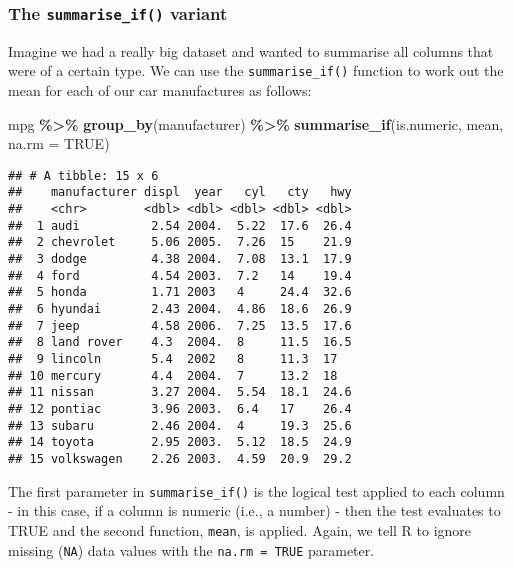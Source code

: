 \documentclass[
]{book}
\newenvironment{Shaded}{\begin{snugshade}}{\end{snugshade}}
\newcommand{\AttributeTok}[1]{\textcolor[rgb]{0.13,0.29,0.53}{#1}}
\newcommand{\ConstantTok}[1]{\textcolor[rgb]{0.56,0.35,0.01}{#1}}
\newcommand{\FunctionTok}[1]{\textcolor[rgb]{0.13,0.29,0.53}{\textbf{#1}}}
\newcommand{\NormalTok}[1]{#1}
\newcommand{\SpecialCharTok}[1]{\textcolor[rgb]{0.81,0.36,0.00}{\textbf{#1}}}
\begin{document}
\hypertarget{the-summarise_if-variant}{%
\subsubsection*{\texorpdfstring{The \texttt{summarise\_if()} variant}{The summarise\_if() variant}}\label{the-summarise_if-variant}}

Imagine we had a really big dataset and wanted to summarise all columns that were of a certain type. We can use the \texttt{summarise\_if()} function to work out the mean for each of our car manufactures as follows:

\begin{Shaded}
\begin{Highlighting}[]
\NormalTok{mpg }\SpecialCharTok{\%\textgreater{}\%} 
  \FunctionTok{group\_by}\NormalTok{(manufacturer) }\SpecialCharTok{\%\textgreater{}\%}
  \FunctionTok{summarise\_if}\NormalTok{(is.numeric, mean, }\AttributeTok{na.rm =} \ConstantTok{TRUE}\NormalTok{)}
\end{Highlighting}
\end{Shaded}

\begin{verbatim}
## # A tibble: 15 x 6
##    manufacturer displ  year   cyl   cty   hwy
##    <chr>        <dbl> <dbl> <dbl> <dbl> <dbl>
##  1 audi          2.54 2004.  5.22  17.6  26.4
##  2 chevrolet     5.06 2005.  7.26  15    21.9
##  3 dodge         4.38 2004.  7.08  13.1  17.9
##  4 ford          4.54 2003.  7.2   14    19.4
##  5 honda         1.71 2003   4     24.4  32.6
##  6 hyundai       2.43 2004.  4.86  18.6  26.9
##  7 jeep          4.58 2006.  7.25  13.5  17.6
##  8 land rover    4.3  2004.  8     11.5  16.5
##  9 lincoln       5.4  2002   8     11.3  17  
## 10 mercury       4.4  2004.  7     13.2  18  
## 11 nissan        3.27 2004.  5.54  18.1  24.6
## 12 pontiac       3.96 2003.  6.4   17    26.4
## 13 subaru        2.46 2004.  4     19.3  25.6
## 14 toyota        2.95 2003.  5.12  18.5  24.9
## 15 volkswagen    2.26 2003.  4.59  20.9  29.2
\end{verbatim}

The first parameter in \texttt{summarise\_if()} is the logical test applied to each column - in this case, if a column is numeric (i.e., a number) - then the test evaluates to TRUE and the second function, \texttt{mean}, is applied. Again, we tell R to ignore missing (\texttt{NA}) data values with the \texttt{na.rm\ =\ TRUE} parameter.
\end{document}
